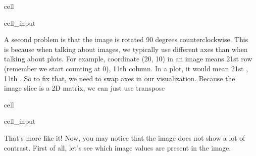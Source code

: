 \documentclass[letterpaper,10pt,english]{jupyterBook}
\begin{document}
\begin{sphinxuseclass}{cell}\begin{sphinxVerbatimInput}

\begin{sphinxuseclass}{cell_input}
\begin{sphinxVerbatim}[commandchars=\\\{\}]
\PYG{p}{[}  \PYG{p}{]}   
\end{sphinxVerbatim}

\end{sphinxuseclass}\end{sphinxVerbatimInput}

\end{sphinxuseclass}
\sphinxAtStartPar
A second problem is that the image is rotated 90 degrees counterclockwise. This is because when talking about images, we typically use different axes than when talking about plots. For example, coordinate (20, 10) in an image means 21st row (remember we start counting at 0), 11th column. In a plot, it would mean 21st , 11th . So to fix that, we need to swap axes in our visualization. Because the image slice is a 2D matrix, we can just use transpose

\begin{sphinxuseclass}{cell}\begin{sphinxVerbatimInput}

\begin{sphinxuseclass}{cell_input}
\begin{sphinxVerbatim}[commandchars=\\\{\}]
\PYG{p}{[}  \PYG{p}{]} 
\end{sphinxVerbatim}

\end{sphinxuseclass}\end{sphinxVerbatimInput}

\end{sphinxuseclass}
\sphinxAtStartPar
That’s more like it! Now, you may notice that the image does not show a lot of contrast. First of all, let’s see which image values are present in the image.
\end{document}

